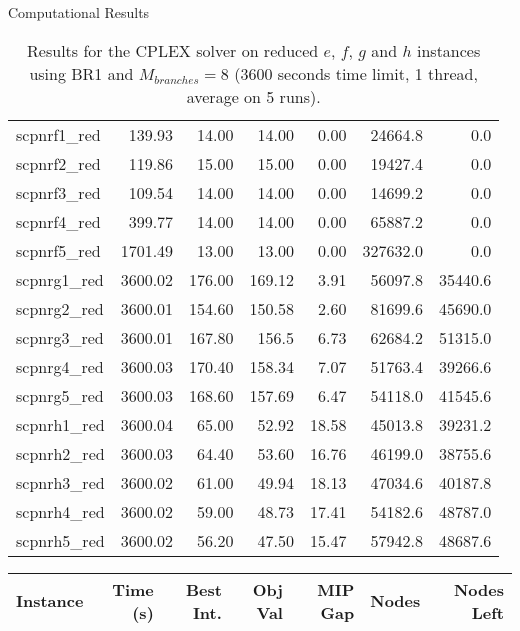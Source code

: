 \documentclass[a4paper,12pt]{mydeitesi_eng}
\begin{document}
\begin{chapter}{Computational Results}
\begin{table}[h]
\begin{center}
\begin{tabular}{l|r|r|r|r|r|r}
scpnrf1\_red & 139.93 & 14.00 & 14.00 & 0.00 & 24664.8 & 0.0\\ 
scpnrf2\_red & 119.86 & 15.00 & 15.00 & 0.00 & 19427.4 & 0.0\\ 
scpnrf3\_red & 109.54 & 14.00 & 14.00 & 0.00 & 14699.2 & 0.0\\ 
scpnrf4\_red & 399.77 & 14.00 & 14.00 & 0.00 & 65887.2 & 0.0\\ 
scpnrf5\_red & 1701.49 & 13.00 & 13.00 & 0.00 & 327632.0 & 0.0\\
\hline
 
scpnrg1\_red & 3600.02 & 176.00 & 169.12 & 3.91 & 56097.8 & 35440.6\\ 
scpnrg2\_red & 3600.01 & 154.60 & 150.58 & 2.60 & 81699.6 & 45690.0\\ 
scpnrg3\_red & 3600.01 & 167.80 & 156.5 & 6.73 & 62684.2 & 51315.0\\ 
scpnrg4\_red & 3600.03 & 170.40 & 158.34 & 7.07 & 51763.4 & 39266.6\\ 
scpnrg5\_red & 3600.03 & 168.60 & 157.69 & 6.47 & 54118.0 & 41545.6\\
\hline
 
scpnrh1\_red & 3600.04 & 65.00 & 52.92 & 18.58 & 45013.8 & 39231.2\\ 
scpnrh2\_red & 3600.03 & 64.40 & 53.60 & 16.76 & 46199.0 & 38755.6\\ 
scpnrh3\_red & 3600.02 & 61.00 & 49.94 & 18.13 & 47034.6 & 40187.8\\ 
scpnrh4\_red & 3600.02 & 59.00 & 48.73 & 17.41 & 54182.6 & 48787.0\\ 
scpnrh5\_red & 3600.02 & 56.20 & 47.50 & 15.47 & 57942.8 & 48687.6\\ 
\end{tabular}
\end{center}
\caption{Results for the CPLEX solver on reduced $e$, $f$, $g$ and $h$ instances using BR1 and $M_{branches} = 8$ (3600 seconds time limit, 1 thread, average on 5  runs).}
\label{tab:ResultBR1_M8_sparse}
\end{table}




\begin{table}[h]
\begin{center}
\begin{tabular}{l|r|r|r|r|r|r}
\textbf{Instance} & \textbf{Time (s)} & \textbf{Best Int.} & \textbf{Obj Val} & \textbf{MIP Gap} & \textbf{Nodes} & \textbf{Nodes Left}\\
\hline


\end{tabular}
\end{center}
\end{table}
\end{chapter}
\end{document}
